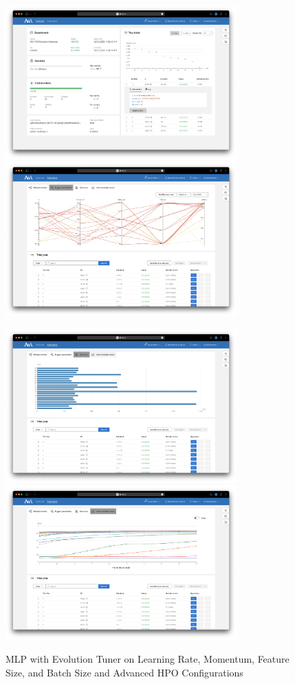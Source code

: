 \documentclass{article}
\begin{document}
\begin{figure}
	\centerline{\includegraphics[width=3.5in]{../proj3/figures/mlp_evolution_batch_advanced_overview.png}\includegraphics[width=3.5in]{../proj3/figures/mlp_evolution_batch_advanced_hyperparameter.png}}
	\centerline{\includegraphics[width=3.5in]{../proj3/figures/mlp_evolution_batch_advanced_latency.png}\includegraphics[width=3.5in]{../proj3/figures/mlp_evolution_batch_advanced_intermediate.png}}
	\caption{MLP with Evolution Tuner on Learning Rate, Momentum, Feature Size, and Batch Size and Advanced HPO Configurations}
	\label{fig:mlp-evolution-batch-advanced}
\end{figure}
\end{document}
